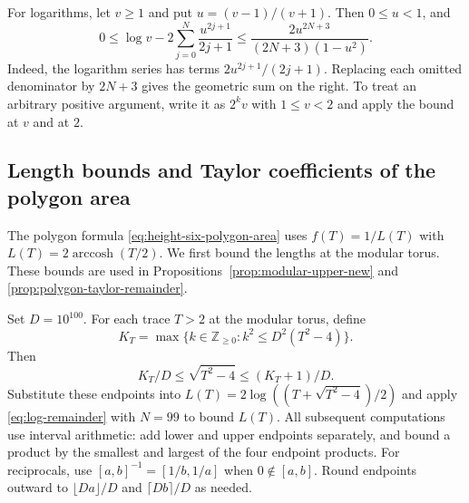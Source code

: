 \documentclass[10pt,twoside]{article}
\theoremstyle{plain}
\theoremstyle{definition}
\theoremstyle{remark}
\DeclareMathOperator{\arccosh}{arccosh}
\newcommand{\Z}{\mathbb Z}
\begin{document}
For logarithms, let $v\geq1$ and put $u=(v-1)/(v+1)$. Then
$0\leq u<1$, and
\begin{equation}
\label{eq:log-remainder}
0\leq\log v-2\sum_{j=0}^{N}\frac{u^{2j+1}}{2j+1}
\leq\frac{2u^{2N+3}}{(2N+3)(1-u^2)}.
\end{equation}
Indeed, the logarithm series \cite[equation~(4.6.4)]{DLMF}
has terms $2u^{2j+1}/(2j+1)$. Replacing each omitted denominator
by $2N+3$ gives the geometric sum on the right. To treat an arbitrary
positive argument, write it as $2^k v$ with $1\leq v<2$ and apply
the bound at $v$ and at $2$.

\subsection{Length bounds and Taylor coefficients of the polygon area}
\label{app:taylor-coefficients}

The polygon formula \eqref{eq:height-six-polygon-area} uses
$f(T)=1/L(T)$ with $L(T)=2\arccosh(T/2)$. We first bound the
lengths at the modular torus. These bounds are used in
Propositions~\ref{prop:modular-upper-new} and
\ref{prop:polygon-taylor-remainder}.

Set $D=10^{100}$. For each trace $T>2$ at the modular torus, define
$$
K_T=\max\{k\in\Z_{\geq0}:k^2\leq D^2(T^2-4)\}.
$$
Then
\begin{equation*}
K_T/D\leq\sqrt{T^2-4}\leq(K_T+1)/D.
\end{equation*}
Substitute these endpoints into $L(T)=2\log((T+\sqrt{T^2-4})/2)$
and apply \eqref{eq:log-remainder} with $N=99$ to bound $L(T)$.
All subsequent computations use interval arithmetic: add lower
and upper endpoints separately, and bound a product by the smallest
and largest of the four endpoint products. For reciprocals, use
$[a,b]^{-1}=[1/b,1/a]$ when $0\notin[a,b]$.
Round endpoints outward to $\lfloor Da\rfloor/D$ and $\lceil Db\rceil/D$
as needed.
\end{document}
